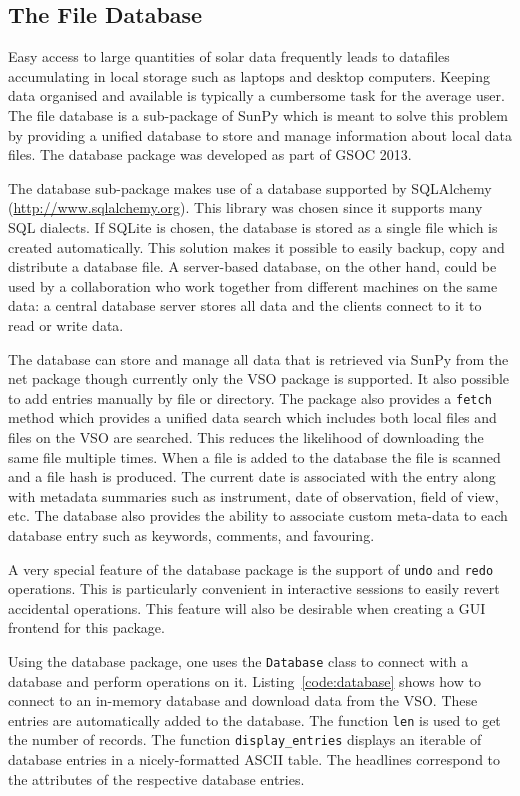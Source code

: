 \subsection{The File Database}\label{ssec:db}

Easy access to large quantities of solar data frequently leads to datafiles accumulating
in local storage such as laptops and desktop computers. Keeping data organised and available
is typically a cumbersome task for the average user. The file database is a sub-package of 
SunPy which is meant to solve this problem by providing a unified database to store and manage information about 
local data files. The database package was developed as part of GSOC 2013.

The database sub-package makes use of a database supported by
SQLAlchemy (\url{http://www.sqlalchemy.org}). This library was chosen
since it supports many SQL dialects. 
If SQLite is chosen, the database is stored as a single file which is
created automatically. This solution makes it possible to easily backup, copy and distribute
a database file. A server-based database, on the other hand, could be used by a collaboration 
who work together from different machines on the
same data: a central database server stores all data and the clients connect to
it to read or write data.

The database can store and manage all data that is retrieved via SunPy from the net
package though currently only the \textsc{VSO} package is supported. 
It also possible to add entries manually by file or directory. The package also provides
a \texttt{fetch} method which provides a unified data search which includes both local files
and files on the \textsc{VSO} are searched. This reduces the likelihood of downloading the same file 
multiple times. When a file is added to the database the file is scanned and a file hash is produced. 
The current date is associated with the entry along with metadata summaries such 
as instrument, date of observation, field of view, etc. 
The database also provides the ability to associate custom meta-data to 
each database entry such as keywords, comments, and favouring.

A very special feature of the database package is the support of \texttt{undo}
and \texttt{redo} operations. This is particularly convenient in
interactive sessions to easily revert accidental operations. 
This feature will also be desirable when creating a GUI frontend for this package.

Using the database package, one uses the \texttt{Database} class to connect
with a database and perform operations on it. Listing~\ref{code:database} shows how to connect
to an in-memory database and download data from the \textsc{VSO}. These entries are
automatically added to the database. The function \texttt{len} is used to get the number of
records. The function \texttt{display\_entries} displays an iterable of database entries
in a nicely-formatted \textsc{ASCII} table. The headlines correspond to the
attributes of the respective database entries.

